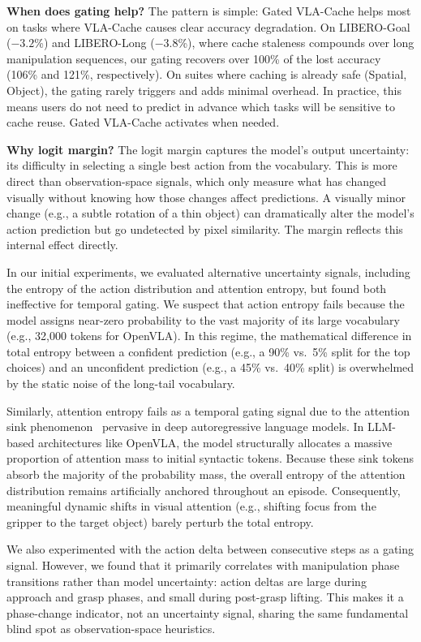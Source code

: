 \documentclass[letterpaper, 10 pt, conference]{ieeeconf}  %
\newcommand{\ourmethod}{Gated VLA-Cache}
\begin{document}
\textbf{When does gating help?}
The pattern is simple: \ourmethod{} helps most on tasks where
VLA-Cache causes clear accuracy degradation.
On LIBERO-Goal ($-3.2$\%) and LIBERO-Long ($-3.8$\%), where cache
staleness compounds over long manipulation sequences, our gating
recovers over 100\% of the lost accuracy (106\% and 121\%, respectively).
On suites where caching is already safe (Spatial, Object), the gating
rarely triggers and adds minimal overhead.
In practice, this means users do not need to predict in advance which
tasks will be sensitive to cache reuse. \ourmethod{} activates when needed.

\textbf{Why logit margin?}
The logit margin captures the model's output uncertainty:
its difficulty in selecting a single best action from the vocabulary.
This is more direct than
observation-space signals, which only measure what has changed
visually without knowing how those changes affect predictions.
A visually minor change (e.g., a subtle rotation of a thin object) can
dramatically alter the model's action prediction but go undetected by
pixel similarity.
The margin reflects this internal effect directly.

In our initial experiments, we evaluated alternative uncertainty signals, including the entropy of the action distribution and attention entropy, but found both ineffective for temporal gating. We suspect that action entropy fails because the model assigns near-zero probability to the vast majority of its large vocabulary (e.g., 32,000 tokens for OpenVLA). In this regime, the mathematical difference in total entropy between a confident prediction (e.g., a 90\% vs.\ 5\% split for the top choices) and an unconfident prediction (e.g., a 45\% vs.\ 40\% split) is overwhelmed by the static noise of the long-tail vocabulary.

Similarly, attention entropy fails as a temporal gating signal due to the attention sink phenomenon~\cite{xiao2023efficient} pervasive in deep autoregressive language models. In LLM-based architectures like OpenVLA, the model structurally allocates a massive proportion of attention mass to initial syntactic tokens. Because these sink tokens absorb the majority of the probability mass, the overall entropy of the attention distribution remains artificially anchored throughout an episode. Consequently, meaningful dynamic shifts in visual attention (e.g., shifting focus from the gripper to the target object) barely perturb the total entropy.

We also experimented with the action delta between consecutive steps as a gating signal. However, we found that it primarily correlates with manipulation phase transitions rather than model uncertainty: action deltas are large during approach and grasp phases, and small during post-grasp lifting. This makes it a phase-change indicator, not an uncertainty signal, sharing the same fundamental blind spot as observation-space heuristics.
\end{document}
